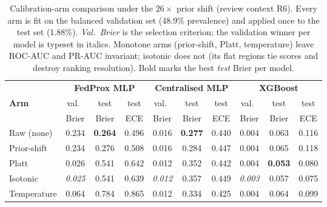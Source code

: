 \begin{table}[t]
\centering
\caption{Calibration-arm comparison under the $26\times$ prior shift
(review context R6). Every arm is fit on the balanced validation set
(48.9\% prevalence) and applied once to the test set (1.88\%).
\emph{Val.\ Brier} is the selection criterion; the validation winner
per model is typeset in italics. Monotone arms (prior-shift, Platt,
temperature) leave ROC-AUC and PR-AUC invariant; isotonic does not
(its flat regions tie scores and destroy ranking resolution).
Bold marks the best \emph{test} Brier per model.}
\label{tab:calib}
\footnotesize
\setlength{\tabcolsep}{3.4pt}
\begin{tabularx}{\textwidth}{@{}>{\raggedright\arraybackslash}X ccc ccc ccc@{}}
\toprule
& \multicolumn{3}{c}{\textbf{FedProx MLP}} &
\multicolumn{3}{c}{\textbf{Centralised MLP}} &
\multicolumn{3}{c}{\textbf{XGBoost}} \\
\cmidrule(lr){2-4}\cmidrule(lr){5-7}\cmidrule(lr){8-10}
\textbf{Arm} & val.\ & test & test & val.\ & test & test & val.\ & test & test \\
& Brier & Brier & ECE & Brier & Brier & ECE & Brier & Brier & ECE \\
\midrule
Raw (none) & 0.234 & \textbf{0.264} & 0.496 & 0.016 & \textbf{0.277} & 0.440 & 0.004 & 0.063 & 0.116 \\
Prior-shift & 0.234 & 0.276 & 0.508 & 0.016 & 0.284 & 0.447 & 0.004 & 0.065 & 0.118 \\
Platt & 0.026 & 0.541 & 0.642 & 0.012 & 0.352 & 0.442 & 0.004 & \textbf{0.053} & 0.080 \\
Isotonic & \textit{0.025} & 0.541 & 0.639 & \textit{0.012} & 0.357 & 0.449 & \textit{0.003} & 0.057 & 0.075 \\
Temperature & 0.064 & 0.784 & 0.865 & 0.012 & 0.334 & 0.425 & 0.004 & 0.064 & 0.099 \\
\bottomrule
\end{tabularx}
\end{table}

